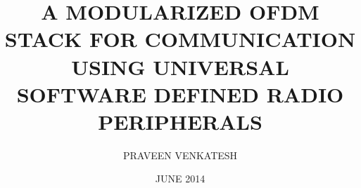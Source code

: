 \title{A MODULARIZED OFDM STACK FOR COMMUNICATION USING UNIVERSAL SOFTWARE
       DEFINED RADIO PERIPHERALS}

\author{PRAVEEN VENKATESH}

\date{JUNE 2014}

\maketitle
